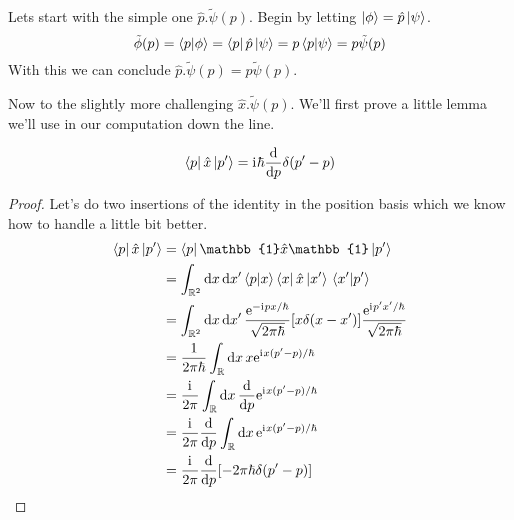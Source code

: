 \documentclass[boxes,pages]{homework}
\makeatletter
\newcommand{\iu}{\mathrm{i}\mkern1mu}
\newcommand{\e}{\mathrm{e}}
\numberwithin{@problem}{section}
\makeatother
\begin{document}
\begin{solution}
	Lets start with the simple one $\hat{p}.\tilde{\psi}(p)$. Begin by letting $\ket{\phi} = \hat{p}\ket{\psi}$.
	\begin{equation*}
		\tilde{\phi}(p) = \braket{p}{\phi} = \bra{p}\hat{p}\ket{\psi} = p\braket{p}{\psi} = p\tilde{\psi}(p)
	\end{equation*}
	With this we can conclude $\hat{p}.\tilde{\psi}(p) = p\tilde{\psi}(p)$.

	Now to the slightly more challenging $\hat{x}.\tilde{\psi}(p)$. We'll first prove a little lemma we'll use in our computation down the line.
	\begin{lemma}
		\begin{equation*}
			\bra{p}\hat{x}\ket*{p'} = \iu\hbar\dv{p}\delta(p' - p)
		\end{equation*}
	\end{lemma}
	\begin{proof}
		Let's do two insertions of the identity in the position basis which we know how to handle a little bit better.
		\begin{align*}
			\bra{p}\hat{x}\ket*{p'} & = \bra{p}\mathbb{1}\hat{x}\mathbb{1}\ket*{p'}                                                                                                \\
			                        & = \int_{\mathbb{R}^2}\dd{x}\dd{x'}\braket{p}{x}\bra{x}\hat{x}\ket*{x'}\braket*{x'}{p'}                                                       \\
			                        & = \int_{\mathbb{R}^2}\dd{x}\dd{x'}\frac{\e^{-\iu px/\hbar}}{\sqrt{2\pi\hbar}}\qty[x\delta(x-x')]\frac{\e^{\iu p'x'/\hbar}}{\sqrt{2\pi\hbar}} \\
			                        & = \frac{1}{2\pi\hbar}\int_\mathbb{R}\dd{x}x\e^{\iu x(p' - p)/\hbar}                                                                          \\
			                        & = \frac{\iu}{2\pi}\int_\mathbb{R}\dd{x}\dv{p}\e^{\iu x(p' - p)/\hbar}                                                                        \\
			                        & = \frac{\iu}{2\pi}\dv{p}\int_\mathbb{R}\dd{x}\e^{\iu x(p' - p)/\hbar}                                                                        \\
			                        & = \frac{\iu}{2\pi}\dv{p}\qty[-2\pi\hbar\delta(p'-p)]                                                                                         \\

\end{align*}
\end{proof}
\end{solution}
\end{document}
